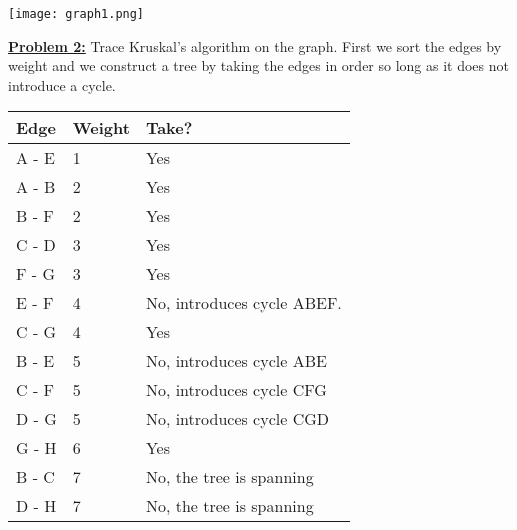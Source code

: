 \documentclass[11pt]{article}
\begin{document}
\begin{flushleft}
	\texttt{[image: graph1.png]}
	\newpage
	\item\textbf{\underline{Problem 2:}} Trace Kruskal's algorithm on the graph.
	\newline
	First we sort the edges by weight and we construct a tree by taking the edges in order so long as it does not introduce a cycle. 
	\newline
	\begin{tabular}{ | p{2cm} | p{2cm} | p{5cm} | }
		\hline
		Edge & Weight & Take? \\
		

		\hline
		A - E & 1 & Yes \\
		
		\hline
		A - B & 2 & Yes \\
		
		\hline
		B - F & 2 & Yes \\
		
		\hline
		C - D & 3 & Yes \\
		
		\hline
		F - G & 3 & Yes \\
		
		\hline
		E - F & 4 & No, introduces cycle ABEF. \\
		
		\hline
		C - G & 4 & Yes \\
		
		\hline
		B - E & 5 & No, introduces cycle ABE \\
		
		\hline
		C - F & 5 & No, introduces cycle CFG \\
		
		\hline
		D - G & 5 & No, introduces cycle CGD \\
		
		\hline
		G - H & 6 & Yes \\
		
		\hline
		B - C & 7 & No, the tree is spanning \\
		
		\hline
		D - H & 7 & No, the tree is spanning \\
		
		\hline
		

\end{tabular}
\end{flushleft}
\end{document}
